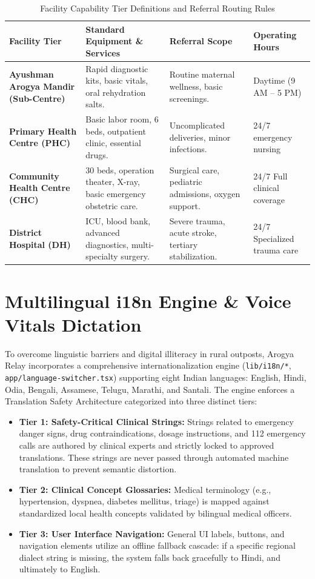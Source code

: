 \documentclass[12pt,a4paper,oneside]{report}
\begin{document}
\begin{table}[!htbp]
\centering
\small
\renewcommand{\arraystretch}{1.3}
\begin{tabularx}{\textwidth}{L{3.2cm} Y Y L{2.8cm}}
\toprule
\textbf{Facility Tier} & \textbf{Standard Equipment \& Services} & \textbf{Referral Scope} & \textbf{Operating Hours} \\
\midrule
\textbf{Ayushman Arogya Mandir (Sub-Centre)} & Rapid diagnostic kits, basic vitals, oral rehydration salts. & Routine maternal wellness, basic screenings. & Daytime (9 AM -- 5 PM) \\
\textbf{Primary Health Centre (PHC)} & Basic labor room, 6 beds, outpatient clinic, essential drugs. & Uncomplicated deliveries, minor infections. & 24/7 emergency nursing \\
\textbf{Community Health Centre (CHC)} & 30 beds, operation theater, X-ray, basic emergency obstetric care. & Surgical care, pediatric admissions, oxygen support. & 24/7 Full clinical coverage \\
\textbf{District Hospital (DH)} & ICU, blood bank, advanced diagnostics, multi-specialty surgery. & Severe trauma, acute stroke, tertiary stabilization. & 24/7 Specialized trauma care \\
\bottomrule
\end{tabularx}
\caption{Facility Capability Tier Definitions and Referral Routing Rules}
\label{tab:facility_tiers}
\end{table}

\section{Multilingual i18n Engine \& Voice Vitals Dictation}
To overcome linguistic barriers and digital illiteracy in rural outposts, Arogya Relay incorporates a comprehensive internationalization engine (\texttt{lib/i18n/*}, \texttt{app/language-switcher.tsx}) supporting eight Indian languages: English, Hindi, Odia, Bengali, Assamese, Telugu, Marathi, and Santali. The engine enforces a Translation Safety Architecture categorized into three distinct tiers:

\begin{itemize}[leftmargin=1.5em,itemsep=1pt,topsep=1pt,parsep=0pt]
    \item \textbf{Tier 1: Safety-Critical Clinical Strings:} Strings related to emergency danger signs, drug contraindications, dosage instructions, and 112 emergency calls are authored by clinical experts and strictly locked to approved translations. These strings are never passed through automated machine translation to prevent semantic distortion.
    \item \textbf{Tier 2: Clinical Concept Glossaries:} Medical terminology (e.g., hypertension, dyspnea, diabetes mellitus, triage) is mapped against standardized local health concepts validated by bilingual medical officers.
    \item \textbf{Tier 3: User Interface Navigation:} General UI labels, buttons, and navigation elements utilize an offline fallback cascade: if a specific regional dialect string is missing, the system falls back gracefully to Hindi, and ultimately to English.
\end{itemize}
\end{document}
